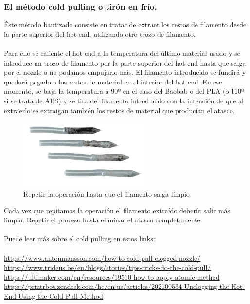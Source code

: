 \documentclass[11pt,a4paper]{article}
\begin{document}
	\subsubsection{El método cold pulling o tirón en frío.}
Éste método bautizado consiste en tratar de extraer los restos de filamento desde la parte superior del hot-end, utilizando otro trozo de filamento.\\\\
Para ello se caliente el hot-end a la temperatura del último material usado y se introduce un trozo de filamento por la parte superior del hot-end hasta que salga por el nozzle o no podamos empujarlo más. El filamento introducido se fundirá y quedará pegado a los restos de material en el interior del hot-end. En ese momento, se baja la temperatura a 90º en el caso del Baobab o del PLA (o 110º si se trata de ABS) y se tira del filamento introducido con la intención de que al extraerlo se extraigan también los restos de material que producían el atasco.\begin{figure}[H]
\centering
\includegraphics[width=0.6\textwidth,cfbox=azul_marcos 4pt 0pt]{FOTOS/COLD_PULLING}
\caption*{Repetir la operación hasta que el filamento salga limpio}
\end{figure}
Cada vez que repitamos la operación el filamento extraído debería salir más limpio. Repetir el proceso hasta eliminar el atasco completamente.\\\\
Puede leer más sobre el cold pulling en estos links: \\\\
\url{https://www.antonmansson.com/how-to-cold-pull-clogged-nozzle/}\\
\url{https://www.trideus.be/en/blogs/stories/tips-tricks-do-the-cold-pull/}\\
\url{https://ultimaker.com/en/resources/19510-how-to-apply-atomic-method}\\
\url{https://printrbot.zendesk.com/hc/en-us/articles/202100554-Unclogging-the-Hot-End-Using-the-Cold-Pull-Method}
\end{document}
